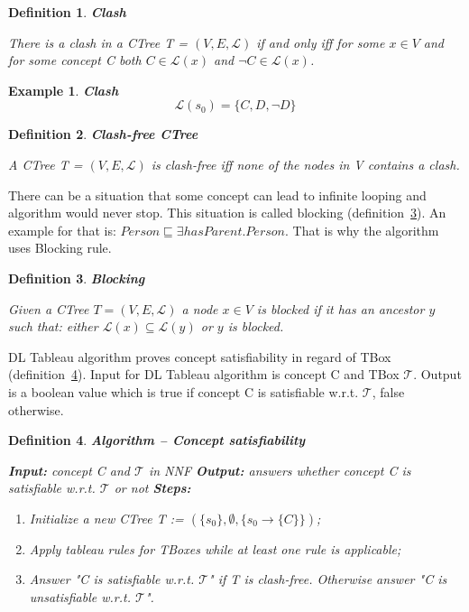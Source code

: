\documentclass[12pt,a4paper]{article}
\newtheorem{definition}{Definition}[subsection]
\newtheorem{example}{Example}[subsection]
\begin{document}
\begin{definition}{\textbf{Clash}}
	\label{def:clash}

	There is a clash in a CTree T = $(V,E, \mathcal{L})$ if and only iff for some $x \in V$ and for some concept C both $C \in \mathcal{L}(x)$ and $\neg C \in \mathcal{L}(x)$.
\end{definition}

\begin{example}{\textbf{Clash}}
	\[ \mathcal{L}(s_{0}) = \{ C, D, \neg D \} \]
\end{example}

\begin{definition}{\textbf{Clash-free CTree}}

A CTree T = $(V,E, \mathcal{L})$ is clash-free iff none of the nodes in V contains a clash.
\end{definition}

There can be a situation that some concept can lead to infinite looping and algorithm would never stop. This situation is called blocking (definition~\ref{def:blocking}). An example for that is: $Person \sqsubseteq \exists hasParent.Person$. That is why the algorithm uses Blocking rule.

\begin{definition}{\textbf{Blocking}}
	\label{def:blocking}
	
	Given a CTree $T = (V, E, \mathcal{L})$ a node $x \in V$ is blocked if it has an ancestor $y$ such that: either $\mathcal{L}(x) \subseteq \mathcal{L}(y)$ or $y$ is blocked.
\end{definition}

DL Tableau algorithm proves concept satisfiability in regard of TBox (definition~\ref{def:conceptSatisfiability}). Input for DL Tableau algorithm is concept C and TBox $\mathcal{T}$. Output is a boolean value which is true if concept C is satisfiable w.r.t. $\mathcal{T}$, false otherwise.

\begin{definition}{\textbf{Algorithm -- Concept satisfiability}}	
	\label{def:conceptSatisfiability}

	\textbf{Input:} concept C and $\mathcal{T}$ in NNF \newline
	\indent \textbf{Output:} answers whether concept C is satisfiable w.r.t. $\mathcal{T}$ or not \newline
	\indent \textbf{Steps:}
	\begin{enumerate}
		\item Initialize a new CTree T := $(\{s_{0}\}, \emptyset, \{s_{0} \rightarrow \{C\}\})$;
		\item Apply tableau rules for TBoxes while at least one rule is applicable;
		\item Answer "C is satisfiable w.r.t. $\mathcal{T}$" if T is clash-free. Otherwise answer "C is unsatisfiable w.r.t. $\mathcal{T}$".
	\end{enumerate}
\end{definition}
\end{document}

